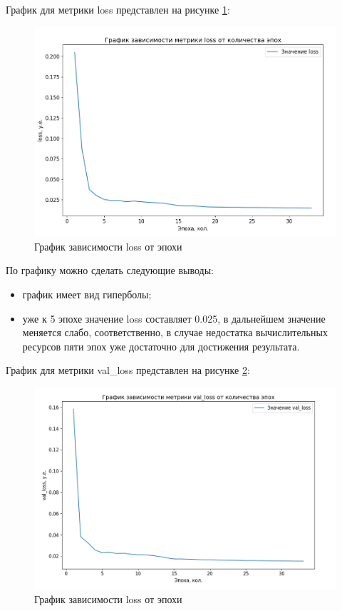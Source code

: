 График для метрики loss представлен на рисунке \ref{tech::loss}:
\FloatBarrier
\begin{figure}[h]	
	\begin{center}
		\includegraphics[width=\linewidth]{inc/png/loss.png}
	\end{center}
	\captionsetup{justification=centering}
	\caption{График зависимости loss от эпохи}
	\label{tech::loss}
\end{figure}
\FloatBarrier

По графику можно сделать следующие выводы:
\begin{itemize}
	\item график имеет вид гиперболы;
	\item уже к 5 эпохе значение loss составляет 0.025, в дальнейшем значение меняется слабо, соответственно, в случае недостатка вычислительных ресурсов пяти эпох уже достаточно для достижения результата.
\end{itemize}

\newpage
График для метрики val\_loss представлен на рисунке \ref{tech::val_loss}:
\FloatBarrier
\begin{figure}[h]	
	\begin{center}
		\includegraphics[width=\linewidth]{inc/png/val_loss.png}
	\end{center}
	\captionsetup{justification=centering}
	\caption{График зависимости loss от эпохи}
	\label{tech::val_loss}
\end{figure}
\FloatBarrier

